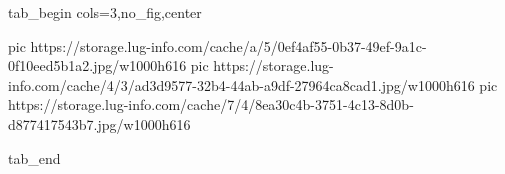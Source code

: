  
 
 
 
 


\ifcmt
  tab_begin cols=3,no_fig,center

     pic https://storage.lug-info.com/cache/a/5/0ef4af55-0b37-49ef-9a1c-0f10eed5b1a2.jpg/w1000h616
		 pic https://storage.lug-info.com/cache/4/3/ad3d9577-32b4-44ab-a9df-27964ca8cad1.jpg/w1000h616
		 pic https://storage.lug-info.com/cache/7/4/8ea30c4b-3751-4c13-8d0b-d877417543b7.jpg/w1000h616

  tab_end
\fi

